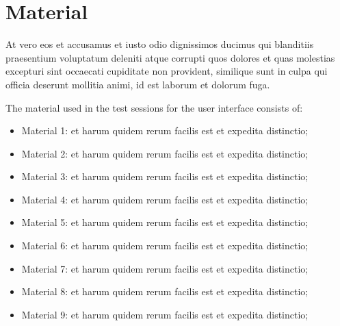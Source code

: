 \section{Material}

At vero eos et accusamus et iusto odio dignissimos ducimus \cite{gardner2008five} qui blanditiis praesentium voluptatum deleniti atque corrupti quos dolores et quas molestias excepturi sint occaecati cupiditate non provident, similique sunt in culpa qui officia deserunt mollitia animi, id est laborum et dolorum fuga.

The material used in the test sessions for the user interface consists of:

\begin{itemize}
  \item Material 1: et harum quidem rerum facilis est et expedita distinctio;
  \item Material 2: et harum quidem rerum facilis est et expedita distinctio;
  \item Material 3: et harum quidem rerum facilis est et expedita distinctio;
  \item Material 4: et harum quidem rerum facilis est et expedita distinctio;
  \item Material 5: et harum quidem rerum facilis est et expedita distinctio;
  \item Material 6: et harum quidem rerum facilis est et expedita distinctio;
  \item Material 7: et harum quidem rerum facilis est et expedita distinctio;
  \item Material 8: et harum quidem rerum facilis est et expedita distinctio;
  \item Material 9: et harum quidem rerum facilis est et expedita distinctio;
\end{itemize}

\clearpage